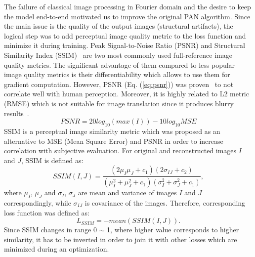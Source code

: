 \documentclass[pmlr]{jmlr}
\begin{document}
The failure of classical image processing in Fourier domain and the desire to keep the model end-to-end motivated us to improve the original PAN algorithm. Since the main issue is the quality of the output images (structural artifacts), the logical step was to add perceptual image quality metric to the loss function and minimize it during training. Peak Signal-to-Noise Ratio (PSNR) and Structural Similarity Index (SSIM)~\citep{wang2004image} are two most commonly used full-reference image quality metrics. The significant advantage of them compared to less popular image quality metrics is their differentiability which allows to use them for gradient computation. However, PSNR (Eq. (\ref{eq:psnr})) was proven~\citep{zhang2012comprehensive} to not correlate well with human perception. Moreover, it is highly related to L2 metric (RMSE) which is not suitable for image translation since it produces blurry results~\citep{isola2017image}.
\begin{equation}
\label{eq:psnr}
    PSNR=20log_{10}(max(I))-10log_{10}MSE
\end{equation}
 SSIM is a perceptual image similarity metric which was proposed as an alternative to MSE (Mean Square Error) and PSNR in order to increase correlation with subjective evaluation. For original and reconstructed images $I$ and $J$, SSIM is defined as:
\begin{equation}
    SSIM(I,J)=\frac{(2\mu _{I}\mu_{J}+c_{1})(2\sigma _{IJ}+c_{2})}{(\mu_{I}^{2}+\mu_{J}^{2}+c_{1})(\sigma_{I}^{2}+\sigma_{J}^{2}+c_{1})},
\end{equation}
where $\mu_I$, $\mu_J$ and $\sigma_I$, $\sigma_J$ are mean and variance of images $I$ and $J$ correspondingly, while $\sigma _{IJ}$ is covariance of the images. Therefore, corresponding loss function was defined as:
\begin{equation}
    L_{SSIM}=-mean(SSIM(I,J)).
\end{equation}
Since SSIM changes in range 0 $\sim$ 1, where higher value corresponds to higher similarity, it has to be inverted in order to join it with other losses which are minimized during an optimization. 
\end{document}
